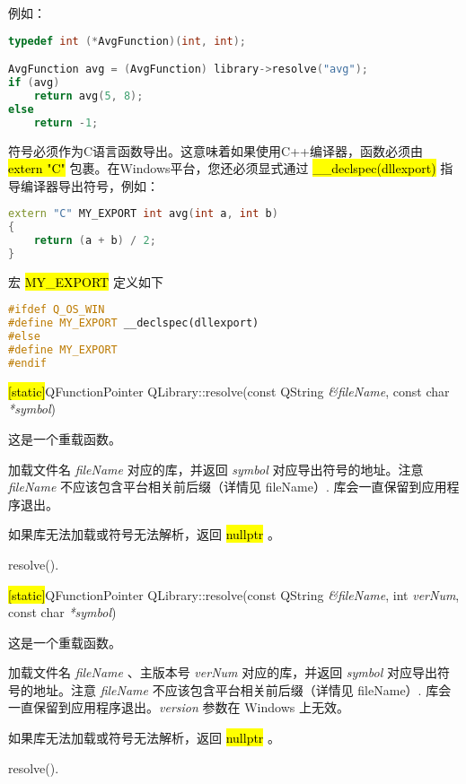 例如：

\begin{lstlisting}[language=C++]
typedef int (*AvgFunction)(int, int);

AvgFunction avg = (AvgFunction) library->resolve("avg");
if (avg)
    return avg(5, 8);
else
    return -1;
\end{lstlisting}

符号必须作为C语言函数导出。这意味着如果使用C++编译器，函数必须由
\hl{extern "C"} 包裹。在Windows平台，您还必须显式通过 \hl{\_\_declspec(dllexport)}
指导编译器导出符号，例如：

\begin{lstlisting}[language=C++]
extern "C" MY_EXPORT int avg(int a, int b)
{
    return (a + b) / 2;
}
\end{lstlisting}

宏 \hl{MY\_EXPORT} 定义如下

\begin{lstlisting}[language=C++]
#ifdef Q_OS_WIN
#define MY_EXPORT __declspec(dllexport)
#else
#define MY_EXPORT
#endif
\end{lstlisting}

\hl{[static]}QFunctionPointer QLibrary::resolve(const QString \emph{\&fileName}, const char \emph{*symbol})

这是一个重载函数。

加载文件名 \emph{fileName} 对应的库，并返回 \emph{symbol} 对应导出符号的地址。注意 \emph{fileName} 不应该包含平台相关前后缀（详情见 fileName）. 库会一直保留到应用程序退出。

如果库无法加载或符号无法解析，返回 \hl{nullptr} 。

\begin{notice}[另请参阅]
resolve().
\end{notice}

\hl{[static]}QFunctionPointer QLibrary::resolve(const QString
\emph{\&fileName}, int \emph{verNum}, const char \emph{*symbol})

这是一个重载函数。

加载文件名 \emph{fileName} 、主版本号 \emph{verNum} 对应的库，并返回 \emph{symbol} 对应导出符号的地址。注意 \emph{fileName} 不应该包含平台相关前后缀（详情见 fileName）. 库会一直保留到应用程序退出。\emph{version} 参数在 Windows 上无效。

如果库无法加载或符号无法解析，返回 \hl{nullptr} 。

\begin{notice}[另请参阅]
resolve().
\end{notice}

